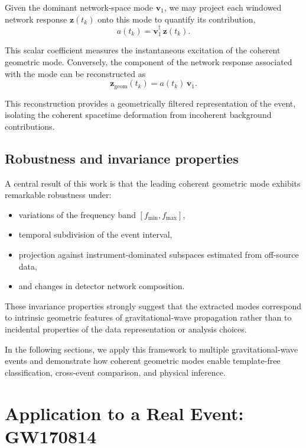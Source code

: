 \documentclass[11pt,a4paper]{article}
\begin{document}
Given the dominant network-space mode $\mathbf{v}_1$, we may project each windowed network response $\mathbf{z}(t_k)$ onto this mode to quantify its contribution,
\begin{equation}
a(t_k) = \mathbf{v}_1^\dagger\, \mathbf{z}(t_k).
\end{equation}

This scalar coefficient measures the instantaneous excitation of the coherent geometric mode.
Conversely, the component of the network response associated with the mode can be reconstructed as
\begin{equation}
\mathbf{z}_{\mathrm{geom}}(t_k)
= a(t_k)\, \mathbf{v}_1.
\end{equation}

This reconstruction provides a geometrically filtered representation of the event, isolating the coherent spacetime deformation from incoherent background contributions.

\subsection{Robustness and invariance properties}

A central result of this work is that the leading coherent geometric mode exhibits remarkable robustness under:
\begin{itemize}
\item variations of the frequency band $[f_{\min}, f_{\max}]$,
\item temporal subdivision of the event interval,
\item projection against instrument-dominated subspaces estimated from off-source data,
\item and changes in detector network composition.
\end{itemize}

These invariance properties strongly suggest that the extracted modes correspond to intrinsic geometric features of gravitational-wave propagation rather than to incidental properties of the data representation or analysis choices.

In the following sections, we apply this framework to multiple gravitational-wave events and demonstrate how coherent geometric modes enable template-free classification, cross-event comparison, and physical inference.

\section{Application to a Real Event: GW170814}
\end{document}
